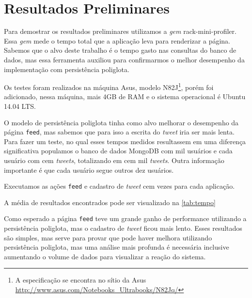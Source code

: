 \chapter{Resultados Preliminares}
\label{chap:resultados}

Para demostrar os resultados preliminares utilizamos a \textit{gem} rack-mini-profiler. Essa \textit{gem} mede o tempo total que a aplicação leva para renderizar a página. Sabemos que o alvo deste trabalho é o tempo gasto nas consultas do banco de dados, mas essa ferramenta auxiliou para confirmarmos o melhor desempenho da implementação com persistência poliglota.

Os testes foram realizados na máquina Asus, modelo N82J\footnote{A especificação se encontra no sítio da Asus \url{http://www.asus.com/Notebooks_Ultrabooks/N82Jq/}}, porém foi adicionado, nessa máquina, mais 4GB de RAM e o sistema operacional é Ubuntu 14.04 LTS.

O modelo de persistência poliglota tinha como alvo melhorar o desempenho da página \verb|feed|, mas sabemos que para isso a escrita do \textit{tweet} iria ser mais lenta. Para fazer um teste, no qual esses tempos medidos resultassem em uma diferença significativa populamos o banco de dados MongoDB com mil usuários e cada usuário com cem \textit{tweets}, totalizando em  cem mil \textit{tweets}. Outra informação importante é que cada usuário segue outros dez usuários.

Executamos as ações \verb|feed| e cadastro de \textit{tweet} cem vezes para cada aplicação.

A média de resultados encontrados pode ser visualizado na \autoref{tab:tempo}


Como esperado a página \verb|feed| teve um grande ganho de performance utilizando a persistência poliglota, mas o cadastro de \textit{tweet} ficou mais lento. Esses resultados são simples, mas serve para provar que pode haver melhora utilizando persistência poliglota, mas uma análise mais profunda é necessária inclusive aumentando o volume de dados para visualizar a reação do sistema.


